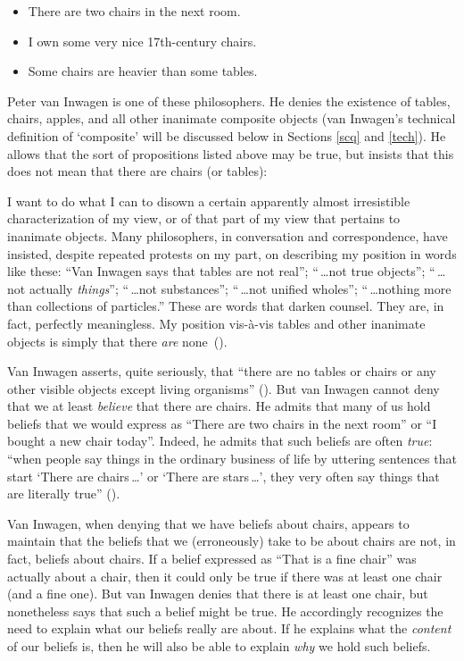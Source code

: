 \documentclass[11pt]{article}
\newenvironment{squote}{%
	\begin{spacing}{1}
	\begin{list}{}{%
	\setlength{\labelwidth}{0pt}%
	\rightmargin\leftmargin%
	}
	\item\relax
	}{%
	\end{list}%
	\end{spacing}
	}
\begin{document}
\begin{spacing}{1.5}
\begin{itemize}
  \item There are two chairs in the next room.
  \item I own some very nice 17th-century chairs.
  \item Some chairs are heavier than some tables.
\end{itemize}

Peter van Inwagen is one of these philosophers.  He denies the
existence of tables, chairs, apples, and all other inanimate composite
objects (van Inwagen's technical definition of `composite' will be
discussed below in Sections \ref{scq} and \ref{tech}).  He allows that
the sort of propositions listed above may be true, but insists that
this does not mean that there are chairs (or tables):
\begin{squote}
I want to do what I can to disown a certain apparently almost
irresistible characterization of my view, or of that part of my view
that pertains to inanimate objects.  Many philosophers, in
conversation and correspondence, have insisted, despite repeated
protests on my part, on describing my position in words like these:
``Van Inwagen says that tables are not real''; ``\,\ldots not true
objects''; ``\,\ldots not actually {\em things}''; ``\,\ldots not
substances''; ``\,\ldots not unified wholes''; ``\,\ldots nothing more
than collections of particles.''  These are words that darken counsel.
They are, in fact, perfectly meaningless.  My position vis-\`{a}-vis
tables and other inanimate objects is simply that there {\em are}
none~(\citeyear[99]{inwagen1995}).
\end{squote}

Van Inwagen asserts, quite seriously, that ``there are no tables or
chairs or any other visible objects except living organisms''
(\citeyear[1]{inwagen1995}).  But van Inwagen cannot deny that we at
least {\em believe} that there are chairs.  He admits that many of us
hold beliefs that we would express as ``There are two chairs in the
next room'' or ``I bought a new chair today''.  Indeed, he admits that
such beliefs are often {\em true}: ``when people say things in the
ordinary business of life by uttering sentences that start `There are
chairs\,\ldots ' or `There are stars\,\ldots ', they very often say
things that are literally true'' (\citeyear[102]{inwagen1995}).

Van Inwagen, when denying that we have beliefs about chairs, appears
to maintain that the beliefs that we (erroneously) take to be about
chairs are not, in fact, beliefs about chairs.  If a belief expressed
as ``That is a fine chair'' was actually about a chair, then it could
only be true if there was at least one chair (and a fine one).  But
van Inwagen denies that there is at least one chair, but nonetheless
says that such a belief might be true.  He accordingly recognizes the
need to explain what our beliefs really are about.  If he explains
what the {\em content} of our beliefs is, then he will also be able to
explain {\em why} we hold such beliefs.

\ifstandalone
\end{spacing}


\fi
\end{document}
